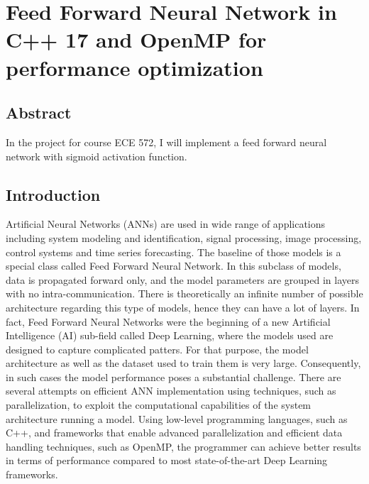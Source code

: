 
\chapter{Feed Forward Neural Network in C++ 17 and OpenMP for performance optimization}

\section{Abstract}


In the project for course ECE 572, I will implement a feed forward neural network with sigmoid activation function. 

\section{Introduction}

Artificial Neural Networks (ANNs) are used in wide range of applications including system modeling and identification, signal processing, image processing, control systems and time series forecasting. The baseline of those models is a special class called Feed Forward Neural Network\cite{bebis1994nns,murat2006overview}. In this subclass of models, data is propagated forward only, and the model parameters are grouped in layers with no intra-communication. There is theoretically an infinite number of possible architecture regarding this type of models, hence they can have a lot of layers. In fact, Feed Forward Neural Networks were the beginning of a new Artificial Intelligence (AI) sub-field called Deep Learning, where the models used are designed to capture complicated patters. For that purpose, the model architecture as well as the dataset used to train them is very large. Consequently, in such cases the model performance poses a substantial challenge. There are several attempts on efficient ANN implementation using techniques, such as parallelization, to exploit the computational capabilities of the system architecture running a model\cite{huqqani2013multicore}. Using low-level programming languages, such as C++\cite{stourstrup2013cpp}, and frameworks that enable advanced parallelization and efficient data handling techniques, such as OpenMP\cite{dagum1998openmp}, the programmer can achieve better results in terms of performance compared to most state-of-the-art Deep Learning frameworks\cite{Jang2008NeuralNI}. 

\par

